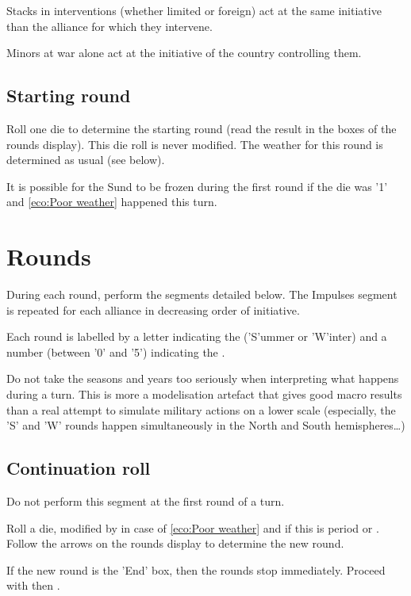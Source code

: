 Stacks in interventions (whether limited or foreign) act at the same
initiative than the alliance for which they intervene.

Minors at war alone act at the initiative of the country controlling them.

\subsection{Starting round}
Roll one die to determine the starting round (read the result in the boxes of
the rounds display). This die roll is never modified. The weather for this
round is determined as usual (see below).

It is possible for the Sund to be frozen during the first round if the die was
'1' and \ref{eco:Poor weather} happened this turn.

\section{Rounds}
During each round, perform the segments detailed below. The Impulses segment
is repeated for each alliance in decreasing order of initiative.

Each round is labelled by a letter indicating the  ('S'ummer or
'W'inter) and a number (between '0' and '5') indicating the .

\begin{designnote}
  Do not take the seasons and years too seriously when interpreting what
  happens during a turn. This is more a modelisation artefact that gives good
  macro results than a real attempt to simulate military actions on a lower
  scale (especially, the 'S' and 'W' rounds happen simultaneously in the North
  and South hemispheres\ldots)
\end{designnote}

\subsection{Continuation roll}
Do not perform this segment at the first round of a turn.

Roll a die, modified by  in case of \ref{eco:Poor weather} and
 if this is period  or . Follow the arrows on
the rounds display to determine the new round.

If the new round is the 'End' box, then the rounds stop immediately. Proceed
with  then .

